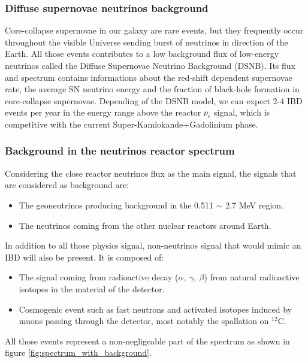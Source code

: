 \subsubsection{Diffuse supernovae neutrinos background}

Core-collapse supernovae in our galaxy are rare events, but they frequently occur throughout the visible Universe sending burst of neutrinos in direction of the Earth. All those events contributes to a low background flux of low-energy neutrinos called the Diffuse Supernovae Neutrino Background (DSNB). Its flux and spectrum contains informations about the red-shift dependent supernovae rate, the average SN neutrino energy and the fraction of black-hole formation in core-collapse supernovae. Depending of the DSNB model, we can expect 2-4 IBD events per year in the energy range above the reactor $\bar{\nu}_e$ signal, which is competitive with the current Super-Kamiokande+Gadolinium phase.

\subsubsection{Background in the neutrinos reactor spectrum}

Considering the close reactor neutrinos flux as the main signal, the signals that are considered as background are:
\begin{itemize}
  \item The geoneutrinos producing background in the 0.511 $\sim$ 2.7 MeV region.
  \item The neutrinos coming from the other nuclear reactors around Earth.
\end{itemize}
In addition to all those physics signal, non-neutrinos signal that would mimic an IBD will also be present. It is composed of:
\begin{itemize}
  \item The signal coming from radioactive decay ($\alpha, ~ \gamma, ~ \beta$) from natural radioactive isotopes in the material of the detector.
  \item Cosmogenic event such as fast neutrons and activated isotopes induced by muons passing through the detector, most notably the spallation on $^12$C.
\end{itemize}
All those events represent a non-negligeable part of the spectrum as shown in figure \ref{fig:spectrum_with_background}.

